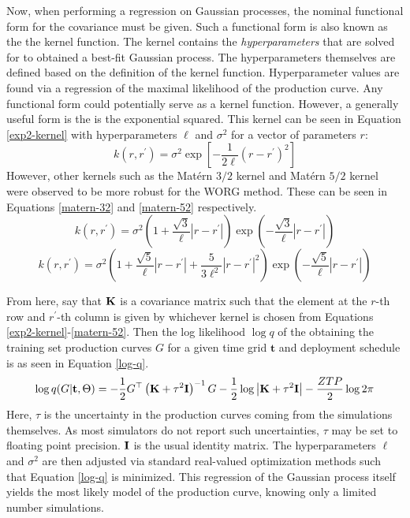 Now, when performing a regression on Gaussian processes, 
the nominal functional form for the covariance must be given. 
Such a functional form is also known as the the kernel function.
The kernel contains the \emph{hyperparameters} that are solved for to 
obtained a best-fit Gaussian process. The hyperparameters themselves are
defined based on the definition of the kernel function. Hyperparameter 
values are found via a regression of the maximal likelihood of 
the production curve. Any functional form could potentially serve as a kernel
function. However, a generally useful form is the is the exponential 
squared. This kernel can be seen in Equation \ref{exp2-kernel} with 
hyperparameters $\ell$ and $\sigma^2$ for a vector of parameters $r$:
\begin{equation}
\label{exp2-kernel}
k(r, r^\prime) = \sigma^2 \exp\left[-\frac{1}{2\ell}(r - r^\prime)^2 \right]
\end{equation}
However, other kernels such as the Mat\'ern $3/2$ kernel and Mat\'ern $5/2$
kernel \cite{paciorek2004nonstationary} were observed to be more robust for 
the WORG method. These can be seen in Equations \ref{matern-32} and 
\ref{matern-52} respectively.
\begin{equation}
\label{matern-32}
k(r, r^\prime) = \sigma^2 
                 \left(1 + \frac{\sqrt{3}}{\ell}|r - r^\prime|\right)
                 \exp\left(-\frac{\sqrt{3}}{\ell}|r - r^\prime|\right)
\end{equation}
\begin{equation}
\label{matern-52}
k(r, r^\prime) = \sigma^2 
                 \left(1 + \frac{\sqrt{5}}{\ell}|r - r^\prime|
                         + \frac{5}{3\ell^2}|r - r^\prime|^2\right)
                 \exp\left(-\frac{\sqrt{5}}{\ell}|r - r^\prime|\right)
\end{equation}

From here, say that $\mathbf{K}$ is a covariance matrix 
such that the element at the $r$-th row and $r^\prime$-th column is 
given by whichever kernel is chosen from 
Equations \ref{exp2-kernel}-\ref{matern-52}. Then the 
log likelihood $\log q$ of the obtaining the training set production curves 
$G$ for a given time grid $\mathbf{t}$ and deployment schedule is as 
seen in Equation \ref{log-q}.
\begin{equation}
\label{log-q}
\log q(G|\mathbf{t}, \Theta) 
    = -\frac{1}{2}G^\top\left(\mathbf{K} + \tau^2\mathbf{I}\right)^{-1}G
      -\frac{1}{2}\log\left|\mathbf{K} + \tau^2\mathbf{I}\right|
      -\frac{ZTP}{2}\log 2\pi
\end{equation}
Here, $\tau$ is the uncertainty in the production curves coming from the 
simulations themselves. As most simulators do not report such uncertainties, 
$\tau$ may be set to floating point precision. $\mathbf{I}$ is the usual identity 
matrix. The hyperparameters $\ell$ and $\sigma^2$ are then adjusted via 
standard real-valued optimization methods such that Equation \ref{log-q} is 
minimized. 
This regression of the Gaussian process itself yields the most likely 
model of the production curve, knowing only a limited number simulations.

